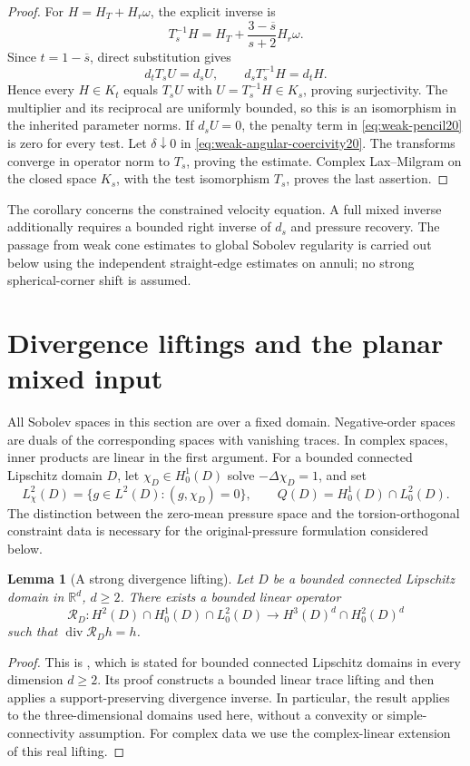 \documentclass[11pt,a4paper]{article}
\newtheorem{lemma}[theorem]{Lemma}
\theoremstyle{remark}
\numberwithin{equation}{section}
\begin{document}
\begin{proof}
For $H=H_T+H_r\omega$, the explicit inverse is
\[
 T_s^{-1}H=H_T+\frac{3-\overline s}{s+2}H_r\omega.
\]
Since $t=1-\overline s$, direct substitution gives
\[
 d_tT_sU=d_sU,\qquad d_sT_s^{-1}H=d_tH.
\]
Hence every $H\in K_t$ equals $T_sU$ with $U=T_s^{-1}H\in K_s$,
proving surjectivity. The multiplier and its reciprocal are uniformly
bounded, so this is an isomorphism in the inherited parameter norms.
If $d_sU=0$,
the penalty term in \eqref{eq:weak-pencil20} is zero for every test.
Let $\delta\downarrow0$ in \eqref{eq:weak-angular-coercivity20}.
The transforms converge in operator norm to $T_s$, proving the estimate.
Complex Lax--Milgram on the closed space $K_s$, with the test isomorphism
$T_s$, proves the last assertion.
\end{proof}

The corollary concerns the constrained velocity equation. A full mixed
inverse additionally requires a bounded right inverse of $d_s$ and pressure
recovery. The passage from weak cone estimates to global Sobolev regularity
is carried out below using the independent straight-edge estimates
on annuli; no strong spherical-corner shift is assumed.



\section{Divergence liftings and the planar mixed input}
\label{sec:g-prelim}

All Sobolev spaces in this section are over a fixed domain. Negative-order
spaces are duals of the corresponding spaces with vanishing traces. In complex
spaces, inner products are linear in the first argument. For a bounded
connected Lipschitz domain $D$, let $\chi_D\in H^1_0(D)$ solve
$-\Delta\chi_D=1$, and set
\[
 L^2_\chi(D)=\{g\in L^2(D):(g,\chi_D)=0\},\qquad
 Q(D)=H^1_0(D)\cap L^2_0(D).
\]
The distinction between the zero-mean pressure space and the torsion-orthogonal
constraint data is necessary for the original-pressure formulation considered
below.

\begin{lemma}[A strong divergence lifting]\label{lem:g-stronglift}
Let $D$ be a bounded connected Lipschitz domain in $\mathbb R^d$, $d\ge2$. There exists
a bounded linear operator
\[
 \mathcal R_D:H^2(D)\cap H^1_0(D)\cap L^2_0(D)
 \longrightarrow H^3(D)^d\cap H^2_0(D)^d
\]
such that $\operatorname{div}\mathcal R_D h=h$.
\end{lemma}
\begin{proof}
This is \cite[Lemma~2.7]{PolygonCompanion2026}, which is stated for
bounded connected Lipschitz domains in every dimension \(d\ge2\).
Its proof constructs a bounded linear trace lifting and then applies
a support-preserving divergence inverse. In particular, the result
applies to the three-dimensional domains used here, without a
convexity or simple-connectivity assumption. For complex data we use
the complex-linear extension of this real lifting.
\end{proof}
\end{document}
